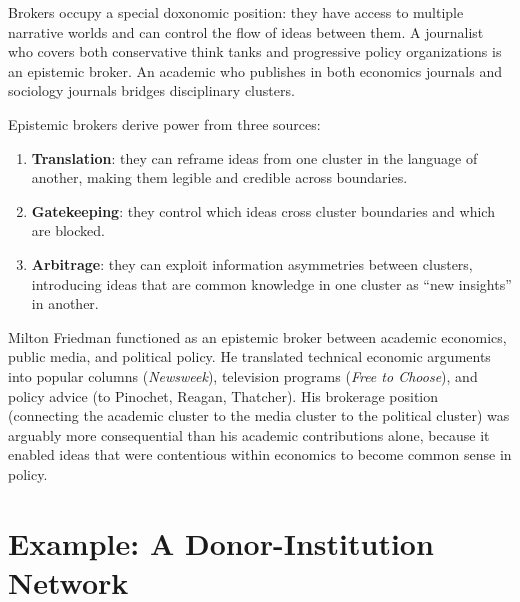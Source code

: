 Brokers occupy a special doxonomic position: they have access to multiple narrative worlds and can control the flow of ideas between them.
A journalist who covers both conservative think tanks and progressive policy organizations is an epistemic broker.
An academic who publishes in both economics journals and sociology journals bridges disciplinary clusters.

\begin{proposition}
\label{prop:broker-power}
Epistemic brokers derive power from three sources:
\begin{enumerate}[nosep]
  \item \textbf{Translation}: they can reframe ideas from one cluster in the language of another, making them legible and credible across boundaries.
  \item \textbf{Gatekeeping}: they control which ideas cross cluster boundaries and which are blocked.
  \item \textbf{Arbitrage}: they can exploit information asymmetries between clusters, introducing ideas that are common knowledge in one cluster as ``new insights'' in another.
\end{enumerate}
\end{proposition}

\begin{example}
\label{ex:brokerage-neoliberal}
Milton Friedman functioned as an epistemic broker between academic economics, public media, and political policy.
He translated technical economic arguments into popular columns (\textit{Newsweek}), television programs (\textit{Free to Choose}), and policy advice (to Pinochet, Reagan, Thatcher).
His brokerage position (connecting the academic cluster to the media cluster to the political cluster) was arguably more consequential than his academic contributions alone, because it enabled ideas that were contentious within economics to become common sense in policy.
\end{example}


\section{Example: A Donor-Institution Network}
\label{sec:ch15-example}


